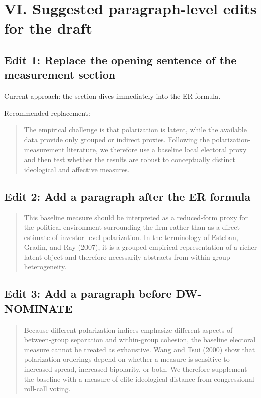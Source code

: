 \documentclass[12pt]{article}
\begin{document}
\section*{VI. Suggested paragraph-level edits for the draft}

\subsection*{Edit 1: Replace the opening sentence of the measurement section}
Current approach: the section dives immediately into the ER formula.

Recommended replacement:
\begin{quote}
The empirical challenge is that polarization is latent, while the available data provide only grouped or indirect proxies. Following the polarization-measurement literature, we therefore use a baseline local electoral proxy and then test whether the results are robust to conceptually distinct ideological and affective measures.
\end{quote}

\subsection*{Edit 2: Add a paragraph after the ER formula}
\begin{quote}
This baseline measure should be interpreted as a reduced-form proxy for the political environment surrounding the firm rather than as a direct estimate of investor-level polarization. In the terminology of Esteban, Grad\'{\i}n, and Ray (2007), it is a grouped empirical representation of a richer latent object and therefore necessarily abstracts from within-group heterogeneity.
\end{quote}

\subsection*{Edit 3: Add a paragraph before DW-NOMINATE}
\begin{quote}
Because different polarization indices emphasize different aspects of between-group separation and within-group cohesion, the baseline electoral measure cannot be treated as exhaustive. Wang and Tsui (2000) show that polarization orderings depend on whether a measure is sensitive to increased spread, increased bipolarity, or both. We therefore supplement the baseline with a measure of elite ideological distance from congressional roll-call voting.
\end{quote}
\end{document}
